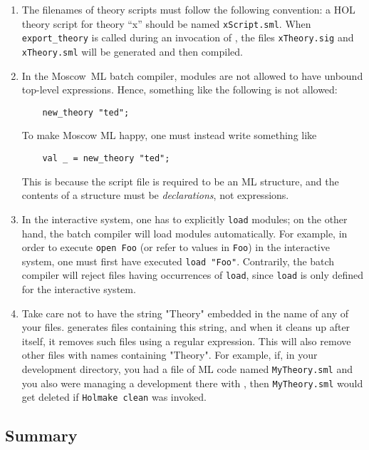 \begin{enumerate}
\item The filenames of theory scripts must follow the following
  convention: a HOL theory script for theory ``x'' should be named
  \texttt{xScript.sml}.  When \verb+export_theory+ is called during an
  invocation of \holmake, the files \texttt{xTheory.sig} and
  \texttt{xTheory.sml} will be generated and then compiled.

\item In the Moscow~ML batch compiler, modules are not allowed to have
  unbound top-level expressions. Hence, something like the following
  is not allowed:
\begin{verbatim}
    new_theory "ted";
\end{verbatim}
To make Moscow ML happy, one must instead write something like
\begin{verbatim}
    val _ = new_theory "ted";
\end{verbatim}
\noindent This is because the script file is required to be an ML
structure, and the contents of a structure must be
\emph{declarations}, not expressions.

\item In the interactive system, one has to explicitly \verb+load+
  modules; on the other hand, the batch compiler will load modules
  automatically.  For example, in order to execute \verb+open Foo+ (or
  refer to values in \verb+Foo+) in the interactive system, one must
  first have executed \verb+load "Foo"+. Contrarily, the batch
  compiler will reject files having occurrences of \verb+load+, since
  \verb+load+ is only defined for the interactive system.

\item Take care not to have the string "Theory" embedded in the name
  of any of your files. \HOL{} generates files containing this string,
  and when it cleans up after itself, it removes such files using a
  regular expression. This will also remove other files with names
  containing "Theory". For example, if, in your development directory,
  you had a file of ML code named \texttt{MyTheory.sml} and you also
  were managing a \HOL{} development there with \holmake, then
  \texttt{MyTheory.sml} would get deleted if \texttt{Holmake~clean}
  was invoked.

\end{enumerate}

\subsection{Summary}

